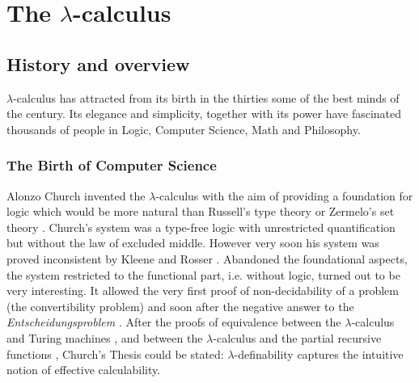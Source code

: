 \chapter{The $\lambda$-calculus}\label{ch:lambda}
\section{History and overview}
$\lambda$-calculus has attracted from its birth in the thirties some of the best minds of the century. Its elegance and simplicity, together with its power have fascinated thousands of people in Logic, Computer Science, Math and Philosophy.
\subsection{The Birth of Computer Science}
Alonzo Church invented the $\lambda$-calculus with the aim of providing a
foundation for logic which would be more natural than Russell’s type theory or
Zermelo’s set theory \cite{}. Church's system was a type-free logic with
unrestricted quantification but without the law of excluded middle. However very soon his system was proved inconsistent by Kleene and Rosser \cite{}. Abandoned the foundational aspects, the system restricted to the functional part, i.e. without logic, turned out to be very interesting. It allowed the very first proof of non-decidability of a problem (the convertibility problem) \cite{} and soon after the negative answer to the \textit{Entscheidungsproblem} \cite{}. After the proofs of equivalence between the $\lambda$-calculus and Turing machines \cite{}, and between the $\lambda$-calculus and the partial recursive functions \cite{}, Church's Thesis could be stated: $\lambda$-definability captures the intuitive notion of effective calculability.
